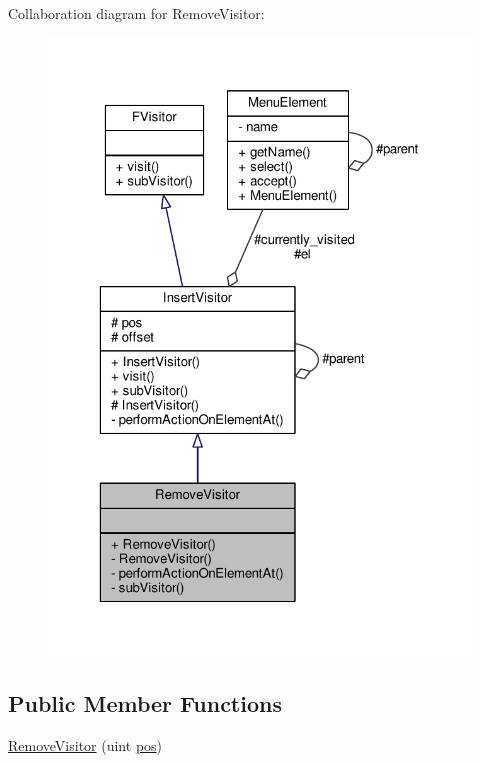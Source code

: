 Collaboration diagram for Remove\+Visitor\+:
\nopagebreak
\begin{figure}[H]
\begin{center}
\leavevmode
\includegraphics[width=323pt]{classRemoveVisitor__coll__graph}
\end{center}
\end{figure}
\subsection*{Public Member Functions}
\begin{DoxyCompactItemize}
\item 
\hyperlink{classRemoveVisitor_ab80c54299d03273980f7306e3c9ec7e7}{Remove\+Visitor} (uint \hyperlink{classInsertVisitor_aeb7469f88fb024421c1dd9cfd3608d7d}{pos})
\end{DoxyCompactItemize}
